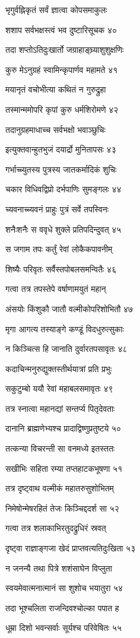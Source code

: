 भृगुर्वह्निकृतं सर्वं ज्ञात्वा कोपसमाकुलः

शशाप सर्वभक्षस्त्वं भव दुष्टारिसूचक ४०

तदा शप्तोऽतिदुःखार्तो जग्राहाङ्घ्र्याशुशुक्षणिः

कुरु मेऽनुग्रहं स्वामिन्कृपार्णव महामते ४१

मयानृतं वचोभीत्या कथितं न गुरुद्रुहा

तस्मान्ममोपरि कृपां कुरु धर्मशिरोमणे ४२

तदानुग्रहमाधाच्च सर्वभक्षो भवाञ्छुचिः

इत्युक्तवान्हुतभुजं दयार्द्रो मुनितापसः ४३

गर्भाच्च्युतस्य पुत्रस्य जातकर्मादिकं शुचिः

चकार विधिवद्विप्रो दर्भपाणिः सुमङ्गलः ४४

च्यवनाच्च्यवनं प्राहुः पुत्रं सर्वे तपस्विनः

शनैःशनैः स ववृधे शुक्ले प्रतिपदिन्दुवत् ४५

स जगाम तपः कर्तुं रेवां लोकैकपावनीम्

शिष्यैः परिवृतः सर्वैस्तपोबलसमन्वितैः ४६

गत्वा तत्र तपस्तेपे वर्षाणामयुतं महान्

अंसयोः किंशुकौ जातौ वल्मीकोपरिशोभितौ ४७

मृगा आगत्य तस्याङ्गे कण्डूं विदधुरुत्सुकाः

न किञ्चित्स हि जानाति दुर्वारतपसावृतः ४८

कदाचिन्मनुरुद्युक्तस्तीर्थयात्रां प्रति प्रभुः

सकुटुम्बो ययौ रेवां महाबलसमावृतः ४९

तत्र स्नात्वा महानद्यां सन्तर्प्य पितृदेवताः

दानानि ब्राह्मणेभ्यश्च प्रादाद्विष्णुप्रतुष्टये ५०

तत्कन्या विचरन्ती सा वनमध्ये इतस्ततः

सखीभिः सहिता रम्या तप्तहाटकभूषणा ५१

तत्र दृष्ट्वाथ वल्मीकं महातरुसुशोभितम्

निमेषोन्मेषरहितं तेजः किञ्चिद्ददर्श सा ५२

गत्वा तत्र शलाकाभिरतुदद्रुधिरं स्रवत्

दृष्ट्वा राज्ञाङ्गजा खेदं प्राप्तवत्यतिदुःखिता ५३

न जनन्यै तथा पित्रे शशंसाघेन विप्लुता

स्वयमेवात्मनात्मानं सा शुशोच भयातुरा ५४

तदा भूश्चलिता राजन्दिवश्चोल्का पपात ह

धूम्रा दिशो भवन्सर्वाः सूर्यश्च परिवेषितः ५५

